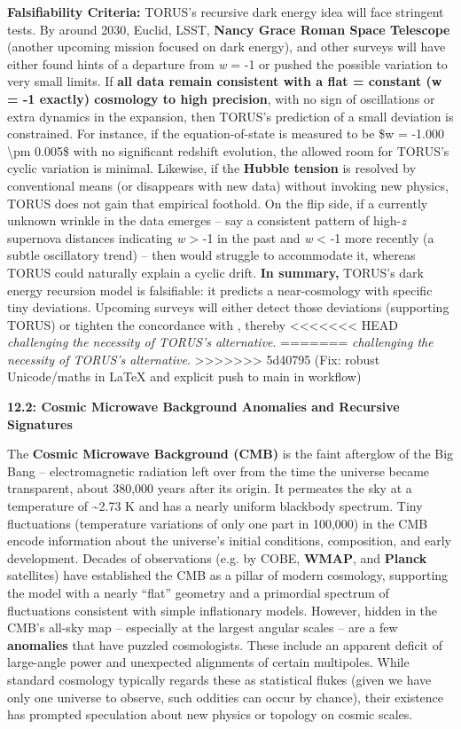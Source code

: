 \documentclass[]{article}
\begin{document}
\textbf{Falsifiability Criteria:} TORUS's recursive dark energy idea
will face stringent tests. By around 2030, Euclid, LSST, \textbf{Nancy
Grace Roman Space Telescope} (another upcoming mission focused on dark
energy), and other surveys will have either found hints of a departure
from \emph{w} = -1 or pushed the possible variation to very small
limits. If \textbf{all data remain consistent with a flat \Lambda = constant
(w = -1 exactly) cosmology to high precision}, with no sign of
oscillations or extra dynamics in the expansion, then TORUS's prediction
of a small deviation is constrained. For instance, if the
equation-of-state is measured to be \$w = -1.000 \textbackslash{}pm
0.005\$ with no significant redshift evolution, the allowed room for
TORUS's cyclic variation is minimal. Likewise, if the \textbf{Hubble
tension} is resolved by conventional means (or disappears with new data)
without invoking new physics, TORUS does not gain that empirical
foothold. On the flip side, if a currently unknown wrinkle in the data
emerges -- say a consistent pattern of high-\emph{z} supernova distances
indicating \emph{w} \textgreater{} -1 in the past and \emph{w}
\textless{} -1 more recently (a subtle oscillatory trend) -- then \LambdaCDM
would struggle to accommodate it, whereas TORUS could naturally explain
a cyclic drift. \textbf{In summary,} TORUS's dark energy recursion model
is falsifiable: it predicts a near-\LambdaCDM cosmology with specific tiny
deviations. Upcoming surveys will either detect those deviations
(supporting TORUS) or tighten the concordance with \LambdaCDM, thereby
<<<<<<< HEAD
\emph{challenging the necessity of TORUS's alternative}\hspace{0pt}.
=======
\emph{challenging the necessity of TORUS's alternative}​.
>>>>>>> 5d40795 (Fix: robust Unicode/maths in LaTeX and explicit push to main in workflow)

\textbf{12.2: Cosmic Microwave Background Anomalies and Recursive
Signatures}

The \textbf{Cosmic Microwave Background (CMB)} is the faint afterglow of
the Big Bang -- electromagnetic radiation left over from the time the
universe became transparent, about 380,000 years after its origin. It
permeates the sky at a temperature of \textasciitilde{}2.73 K and has a
nearly uniform blackbody spectrum. Tiny fluctuations (temperature
variations of only one part in 100,000) in the CMB encode information
about the universe's initial conditions, composition, and early
development. Decades of observations (e.g. by COBE, \textbf{WMAP}, and
\textbf{Planck} satellites) have established the CMB as a pillar of
modern cosmology, supporting the \LambdaCDM model with a nearly ``flat''
geometry and a primordial spectrum of fluctuations consistent with
simple inflationary models. However, hidden in the CMB's all-sky map --
especially at the largest angular scales -- are a few \textbf{anomalies}
that have puzzled cosmologists. These include an apparent deficit of
large-angle power and unexpected alignments of certain multipoles. While
standard cosmology typically regards these as statistical flukes (given
we have only one universe to observe, such oddities can occur by
chance), their existence has prompted speculation about new physics or
topology on cosmic scales.
\end{document}
